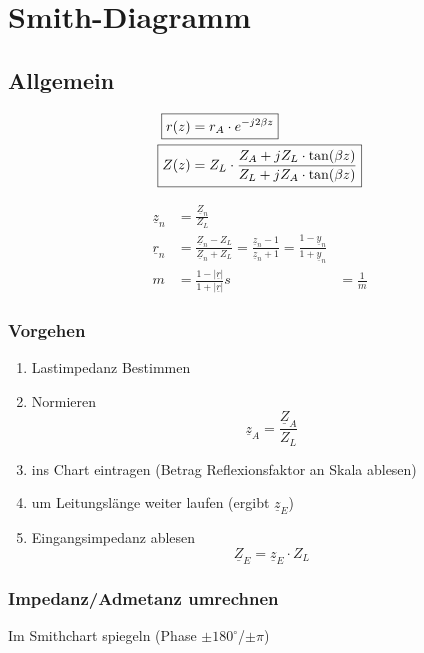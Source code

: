 \section{Smith-Diagramm}

\subsection{Allgemein}
\begin{center}
    \begin{align*}
        \Aboxed{r(z) & = r_A \cdot e^{-j2\beta z}}                                              \\
        \Aboxed{Z(z) & = Z_L\cdot\frac{Z_A+jZ_L\cdot\tan(\beta z)}{Z_L+jZ_A\cdot\tan(\beta z)}}
    \end{align*}
    
\end{center}
\begin{align*}
    \underline{z}_n & = \frac{\underline{Z}_n}{Z_L}                                                                                                                   \\
    \underline{r}_n & = \frac{\underline{Z}_n-Z_L}{\underline{Z}_n+Z_L}= \frac{\underline{z}_n-1}{\underline{z}_n+1}    = \frac{1-\underline{y}_n}{1+\underline{y}_n} \\
    m               & = \frac{1-|\underline{r}|}{1+|\underline{r}|}
    s               & = \frac{1}{m}
\end{align*}

\subsubsection{Vorgehen}
\begin{enumerate}
    \item Lastimpedanz Bestimmen
    \item Normieren
          \[\underline{z}_A = \frac{\underline{Z}_A}{Z_L} \]
    \item ins Chart eintragen (Betrag Reflexionsfaktor an Skala ablesen)
    \item um Leitungslänge weiter laufen (ergibt $\underline{z}_E$)
    \item Eingangsimpedanz ablesen
          \[\underline{Z}_E = \underline{z}_E \cdot Z_L\]
\end{enumerate}

\subsubsection{Impedanz/Admetanz umrechnen}
Im Smithchart spiegeln (Phase $\pm 180^{\circ}$/$\pm \pi$)